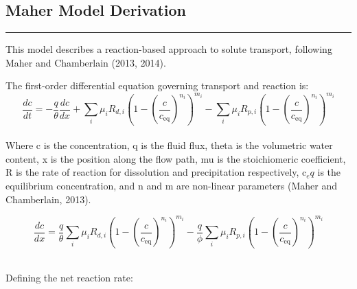 \FloatBarrier

\newpage
\begin{tcolorbox}[
    colback=white,
    colframe=white,
    sharp corners,
    boxrule=0pt,
    breakable,
    width=\dimexpr\textwidth+1cm\relax,
    enlarge left by=-0.5cm,
    leftrule=0mm, rightrule=0mm, toprule=0mm, bottomrule=0mm
]


\subsection{Maher Model Derivation}
\vspace{-5mm}
{\footnotesize

\noindent\rule{\textwidth}{0.5pt}

This model describes a reaction-based approach to solute transport, following Maher and Chamberlain (2013, 2014).

\bsk

The first-order differential equation governing transport and reaction is:\\

\begin{equation}
\frac{dc}{dt} = -\frac{q}{\theta} \frac{dc}{dx} + \sum_{i} \mu_i R_{d,i} \left( 1 - \left( \frac{c}{c_{\text{eq}}} \right)^{n_i} \right)^{m_i} - \sum_{i} \mu_i R_{p,i} \left( 1 - \left( \frac{c}{c_{\text{eq}}} \right)^{n_i} \right)^{m_i}
\end{equation}\\


Where c is the concentration, q is the fluid flux, theta is the volumetric water content, x is the position along the flow path, mu is the stoichiomeric coefficient, R is the rate of reaction for dissolution and precipitation respectively, c$_eq$ is the equilibrium concentration, and n and m are non-linear parameters (Maher and Chamberlain, 2013). 

\begin{equation}
\frac{dc}{dx} =  \frac{q}{\theta}\sum_{i} \mu_i R_{d,i} \left( 1 - \left( \frac{c}{c_{\text{eq}}} \right)^{n_i} \right)^{m_i} - \frac{q}{\phi}\sum_{i} \mu_i R_{p,i} \left( 1 - \left( \frac{c}{c_{\text{eq}}} \right)^{n_i} \right)^{m_i}
\end{equation}\\

\begin{multicols}{2}

Defining the net reaction rate:

\columnbreak


\end{multicols}}
\end{tcolorbox}
